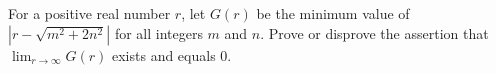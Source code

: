 For a positive real number $r$, let $G(r)$ be the minimum value of $|r
- \sqrt{m^2+2n^2}|$ for all integers $m$ and $n$. Prove or disprove
the assertion that $\lim_{r\to \infty}G(r)$ exists and equals 0.
